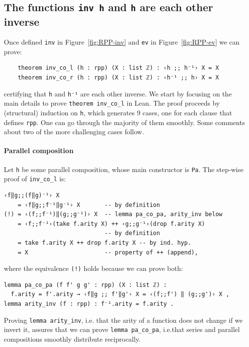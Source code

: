 \documentclass[preprint]{elsarticle}
\theoremstyle{remark}
\newcommand{\LEAN}{\textsf{Lean}\xspace}
\begin{document}
\subsection{The functions \texorpdfstring{\normalfont \lstinline|inv h|}{inv h} and \texorpdfstring{\normalfont \lstinline|h|}{h} are each other inverse}
Once defined \lstinline|inv| in Figure~\ref{fig:RPP-inv} and \lstinline|ev| in Figure~\ref{fig:RPP-ev} we can prove:
\begin{lstlisting}
    theorem inv_co_l (h : rpp) (X : list ℤ) : ‹h ;; h⁻¹› X = X
    theorem inv_co_r (h : rpp) (X : list ℤ) : ‹h⁻¹ ;; h› X = X
\end{lstlisting}
certifying that \lstinline|h| and \lstinline|h⁻¹| are each other inverse.
We start by focusing on the main details to prove \lstinline|theorem inv_co_l| in \LEAN. The proof proceeds by (structural) induction on \lstinline|h|, which generates 9 cases, one for each clause that defines \lstinline|rpp|. One can go through the majority of them smoothly.
Some comments about two of the more challenging cases follow.

\paragraph{Parallel composition} Let \lstinline|h| be some parallel composition, whose main constructor is \lstinline|Pa|. The step-wise proof of \lstinline|inv_co_l| is:
\begin{lstlisting}
‹f‖g;;(f‖g)⁻¹› X
    = ‹f‖g;;f⁻¹‖g⁻¹› X       -- by definition
(!) = ‹(f;;f⁻¹)‖(g;;g⁻¹)› X  -- lemma pa_co_pa, arity_inv below
    = ‹f;;f⁻¹›(take f.arity X) ++ ‹g;;g⁻¹›(drop f.arity X)
                             -- by definition
    = take f.arity X ++ drop f.arity X -- by ind. hyp.
    = X                      -- property of ++ (append),
\end{lstlisting}
where the equivalence \lstinline|(!)| holds because we can prove both:
\begin{lstlisting}
lemma pa_co_pa (f f' g g' : rpp) (X : list ℤ) :
  f.arity = f'.arity → ‹f‖g ;; f'‖g'› X = ‹(f;;f') ‖ (g;;g')› X ,
lemma arity_inv (f : rpp) : f⁻¹.arity = f.arity .
\end{lstlisting}
Proving \lstinline|lemma arity_inv|, i.e. that the arity of a function does not change if we invert it, assures that we can prove \lstinline|lemma pa_co_pa|, i.e.\@ that series and parallel compositions smoothly distribute reciprocally.
\end{document}
